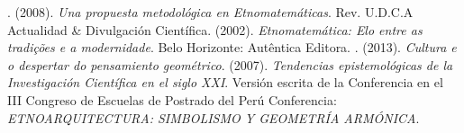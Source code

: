 \begin{titlepage}
\begin{minipage}{0.85\linewidth}
\end{minipage}
\vspace{5pt}
\begin{thebibliography}{99}
. (2008). {\it Una propuesta metodol\'ogica en Etnomatem\'aticas}. Rev. U.D.C.A Actualidad \& Divulgaci\'on Cient\'ifica. 
 (2002). {\it Etnomatem\'atica: Elo entre as tradi\c{c}\~oes e a modernidade}. Belo Horizonte: Aut\^entica Editora.
. (2013). {\it Cultura e o despertar do pensamiento geom\'etrico}.
 (2007). {\it Tendencias epistemol\'ogicas de la Investigaci\'on Cient\'ifica en el siglo XXI}.  Versi\'on escrita de la Conferencia en el III Congreso de Escuelas de Postrado del Per\'u
 Conferencia: {\it ETNOARQUITECTURA: SIMBOLISMO Y GEOMETR\'IA ARM\'ONICA}.

\end{thebibliography}
\end{titlepage}
\author{%
\vspace{2pt}\\
Jhonny Rivera,\vspace{2pt} \\
  Universidad Popular del Cesar,\vspace{2pt} \\
  Valledupar, Colombia,\vspace{2pt}\\
    \hspace*{-2cm}\texttt{\scriptsize jhonnyrivera@unicesar.edu.co }\vspace{10pt} \\
   Sa\'ul Vides,\vspace{2pt} \\
   Universidad Popular del Cesar,\vspace{2pt} \\
  Valledupar, Colombia,\vspace{2pt}\\
    \hspace*{-2cm}\texttt{\scriptsize saulvides@unicesar.edu.co}\vspace{10pt} \\
         }
